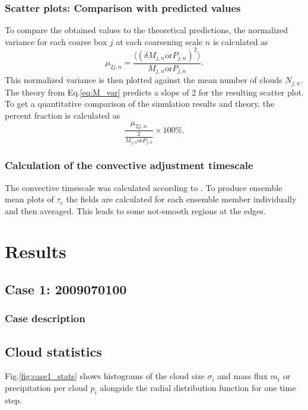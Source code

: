 \documentclass[a4paper, 12pt]{article}
\begin{document}
\subsubsection{Scatter plots: Comparison with predicted values}
To compare the obtained values to the theoretical predictions, the normalized variance for each coarse box $j$ at each coarsening scale $n$ is calculated as 
\begin{equation} \label{eq:normalized_variance}
 \mu_{2 j, n} = \frac{\langle (\delta M_{j,n} \mathrm{ or } P_{j,n})^2 \rangle}{M_{j,n} \mathrm{ or } P_{j,n}}.
\end{equation}
This normalized variance is then plotted against the mean number of clouds $N_{j,n}$. The theory from Eq.\ref{eq:M_var} predicts a slope of 2 for the resulting scatter plot. To get a quantitative comparison of the simulation results and theory, the percent fraction is calculated as
\begin{equation} \label{eq:normalized_variance_percent}
 \frac{\mu_{2 j, n}}{\frac{2}{M_{j,n} \mathrm{ or } P_{j,n}}}\times 100\%.
\end{equation}

\subsubsection{Calculation of the convective adjustment timescale}
The convective timescale was calculated according to \cite{Flack2016}. To produce ensemble mean plots of $\tau_c$ the fields are calculated for each ensemble member individually and then averaged. This leads to some not-smooth regions at the edges. 

\section{Results}

\subsection{Case 1: 2009070100}
\subsubsection{Case description}

\subsection{Cloud statistics}
Fig.\ref{fig:case1_stats} shows histograms of the cloud size $\sigma_i$ and mass flux $m_i$ or precipitation per cloud $p_i$ alongside the radial distribution function for one time step. 
\end{document}
